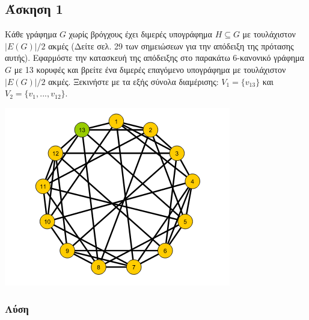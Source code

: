 
\newpage\subsection*{Άσκηση 1}

Κάθε γράφημα $G$ χωρίς βρόγχους έχει διμερές υπογράφημα $H \subseteq G$ με τουλάχιστον 
$|E(G)|/2$ ακμές (Δείτε σελ. 29 των σημειώσεων για την απόδειξη της πρότασης αυτής). 
Εφαρμόστε την κατασκευή της απόδειξης στο παρακάτω 6-κανονικό γράφημα $G$ με 13
κορυφές και βρείτε ένα διμερές επαγόμενο υπογράφημα με τουλάχιστον $|E(G)|/2$ ακμές.
Ξεκινήστε με τα εξής σύνολα διαμέρισης: $V_1 = \{v_{13}\}$ και $V_2 = \{v_1,...,v_{12}\}$.

\begin{center}
    \includegraphics[width=.4\textwidth]{./exercise1/Selection_002.png}
\end{center}

\subsubsection*{Λύση}

